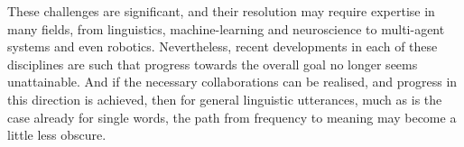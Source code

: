 These challenges are significant, and their resolution may require expertise in many fields, from linguistics, machine-learning and neuroscience to multi-agent systems and even robotics. Nevertheless, recent developments in each of these disciplines are such that progress towards the overall goal no longer seems unattainable. And if the necessary collaborations can be realised, and progress in this direction is achieved, then for general linguistic utterances, much as is the case already for single words, the path from frequency to meaning may become a little less obscure. 
